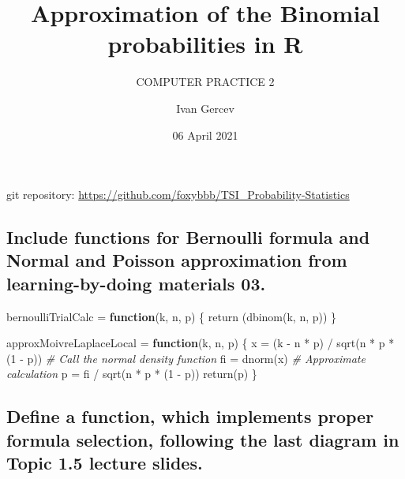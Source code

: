\documentclass[
]{article}
\title{Approximation of the Binomial probabilities in R}
\subtitle{COMPUTER PRACTICE 2}
\author{Ivan Gercev}
\date{06 April 2021}
\newenvironment{Shaded}{\begin{snugshade}}{\end{snugshade}}
\newcommand{\CommentTok}[1]{\textcolor[rgb]{0.56,0.35,0.01}{\textit{#1}}}
\newcommand{\ControlFlowTok}[1]{\textcolor[rgb]{0.13,0.29,0.53}{\textbf{#1}}}
\newcommand{\DecValTok}[1]{\textcolor[rgb]{0.00,0.00,0.81}{#1}}
\newcommand{\FunctionTok}[1]{\textcolor[rgb]{0.00,0.00,0.00}{#1}}
\newcommand{\NormalTok}[1]{#1}
\newcommand{\OtherTok}[1]{\textcolor[rgb]{0.56,0.35,0.01}{#1}}
\newcommand{\SpecialCharTok}[1]{\textcolor[rgb]{0.00,0.00,0.00}{#1}}
\begin{document}
\maketitle

git repository:
\url{https://github.com/foxybbb/TSI_Probability-Statistics}

\hypertarget{include-functions-for-bernoulli-formula-and-normal-and-poisson-approximation-from-learning-by-doing-materials-03.}{%
\subsection{Include functions for Bernoulli formula and Normal and
Poisson approximation from learning-by-doing materials
03.}\label{include-functions-for-bernoulli-formula-and-normal-and-poisson-approximation-from-learning-by-doing-materials-03.}}

\begin{Shaded}
\begin{Highlighting}[]
\NormalTok{bernoulliTrialCalc }\OtherTok{=} \ControlFlowTok{function}\NormalTok{(k, n, p) \{}
  \FunctionTok{return}\NormalTok{ (}\FunctionTok{dbinom}\NormalTok{(k, n, p))}
\NormalTok{\}}
\end{Highlighting}
\end{Shaded}

\begin{Shaded}
\begin{Highlighting}[]
\NormalTok{approxMoivreLaplaceLocal }\OtherTok{=} \ControlFlowTok{function}\NormalTok{(k, n, p) \{}
\NormalTok{  x }\OtherTok{=}\NormalTok{ (k }\SpecialCharTok{{-}}\NormalTok{ n }\SpecialCharTok{*}\NormalTok{ p) }\SpecialCharTok{/} \FunctionTok{sqrt}\NormalTok{(n }\SpecialCharTok{*}\NormalTok{ p }\SpecialCharTok{*}\NormalTok{ (}\DecValTok{1} \SpecialCharTok{{-}}\NormalTok{ p))}
  \CommentTok{\# Call the normal density function}
\NormalTok{  fi }\OtherTok{=} \FunctionTok{dnorm}\NormalTok{(x)}
  \CommentTok{\# Approximate calculation}
\NormalTok{  p }\OtherTok{=}\NormalTok{ fi }\SpecialCharTok{/} \FunctionTok{sqrt}\NormalTok{(n }\SpecialCharTok{*}\NormalTok{ p }\SpecialCharTok{*}\NormalTok{ (}\DecValTok{1} \SpecialCharTok{{-}}\NormalTok{ p))}
  \FunctionTok{return}\NormalTok{(p)}
\NormalTok{\}}
\end{Highlighting}
\end{Shaded}

\hypertarget{define-a-function-which-implements-proper-formula-selection-following-the-last-diagram-in-topic-1.5-lecture-slides.}{%
\subsection{Define a function, which implements proper formula
selection, following the last diagram in Topic 1.5 lecture
slides.}\label{define-a-function-which-implements-proper-formula-selection-following-the-last-diagram-in-topic-1.5-lecture-slides.}}
\end{document}
